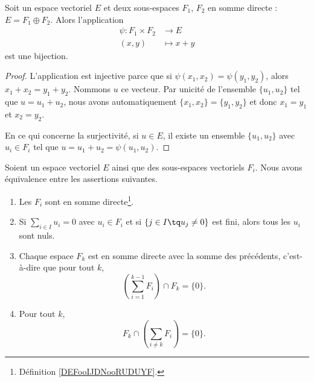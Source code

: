 \begin{lemma}   \label{LEMooHWRVooLedAmF}
	Soit un espace vectoriel \( E\) et deux sous-espaces \( F_1\), \( F_2\) en somme directe :  \( E=F_1\oplus F_2\). Alors l'application
	\begin{equation}
		\begin{aligned}
			\psi\colon F_1\times F_2 & \to E       \\
			(x,y)                    & \mapsto x+y
		\end{aligned}
	\end{equation}
	est une bijection.
\end{lemma}

\begin{proof}
	L'application est injective parce que si \( \psi(x_1,x_2)=\psi(y_1,y_2)\), alors \( x_1+x_2=y_1+y_2\). Nommons \(u\) ce vecteur. Par unicité de l'ensemble \(  \{ u_1,u_2 \} \) tel que \( u=u_1+u_2\), nous avons automatiquement \( \{ x_1,x_2 \}=\{ y_1,y_2 \}\) et donc \( x_1=y_1\) et \( x_2=y_2\).

	En ce qui concerne la surjectivité, si \( u\in E\), il existe un ensemble \( \{ u_1,u_2 \}\) avec \( u_i\in F_i\) tel que \( u=u_1+u_2=\psi(u_1,u_2)\).
\end{proof}


\begin{lemma}         \label{LEMooDQMQooInVVDY}
	Soient un espace vectoriel \( E\) ainsi que des sous-espaces vectoriels \( F_i\). Nous avons équivalence entre les assertions suivantes.

	\begin{enumerate}
		\item
		      Les \( F_i\) sont en somme directe\footnote{Définition \ref{DEFooIJDNooRUDUYF}.}.
		\item
		      Si \( \sum_{i\in I}u_i=0\) avec \( u_i\in F_i\) et si \( \{ j\in I\tq u_j\neq 0 \}\) est fini, alors tous les \( u_i\) sont nuls.
		\item
		      Chaque espace \( F_k\) est en somme directe avec la somme des précédents, c'est-à-dire que pour tout \( k\),
		      \begin{equation}
			      \left( \sum_{i=1}^{k-1}F_i \right)\cap F_k=\{ 0 \}.
		      \end{equation}
		\item   \label{ITEMooPLXGooCOQgen}
		      Pour tout \( k\),
		      \begin{equation}
			      F_k\cap\left( \sum_{i\neq k}F_i \right)=\{ 0 \}.
		      \end{equation}
	\end{enumerate}
\end{lemma}

